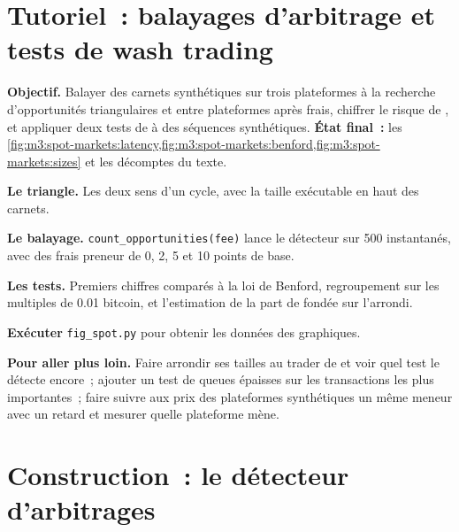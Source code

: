 \section{Tutoriel~: balayages d'arbitrage et tests de wash trading}\label{tut:m3:spot-markets:scan}

\begin{tutorial}
\textbf{Objectif.} Balayer des carnets synthétiques sur trois plateformes à la recherche d'opportunités triangulaires et entre plateformes après frais, chiffrer
le risque de , et appliquer deux tests de  à des séquences synthétiques. \textbf{État final~:}
les \cref{fig:m3:spot-markets:latency,fig:m3:spot-markets:benford,fig:m3:spot-markets:sizes} et les décomptes du
texte.
\begin{tutsteps}
\item \textbf{Le triangle.} Les deux sens d'un cycle, avec la taille exécutable en haut des carnets.
\label{lst:m3:spot-markets:tri}
\item \textbf{Le balayage.} \texttt{count\_opportunities(fee)} lance le détecteur sur 500 instantanés, avec des frais preneur de 0,
2, 5 et 10 points de base.
\item \textbf{Les tests.} Premiers chiffres comparés à la loi de Benford, regroupement sur les multiples de 0.01 bitcoin, et
l'estimation de la part de  fondée sur l'arrondi.
\label{lst:m3:spot-markets:wash}
\item \textbf{Exécuter} \texttt{fig\_spot.py} pour obtenir les données des graphiques.
\end{tutsteps}
\textbf{Pour aller plus loin.} Faire arrondir ses tailles au trader de  et voir quel test le détecte encore~; ajouter un test de queues épaisses sur
les transactions les plus importantes~; faire suivre aux prix des plateformes synthétiques un même meneur avec un retard et mesurer quelle plateforme
mène.
\end{tutorial}

\section{Construction~: le détecteur d'arbitrages}\label{bld:m3:spot-markets:triarb}

